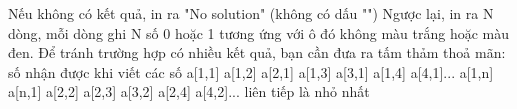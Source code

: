 Nếu không có kết quả, in ra "No solution" (không có dấu "") Ngược lại, in ra N dòng, mỗi dòng ghi N số 0 hoặc 1 tương ứng với ô đó không màu trắng hoặc màu đen. Để tránh trường hợp có nhiều kết quả, bạn cần đưa ra tấm thảm thoả mãn: số nhận được khi viết các số a[1,1] a[1,2] a[2,1] a[1,3] a[3,1] a[1,4] a[4,1]... a[1,n] a[n,1] a[2,2] a[2,3] a[3,2] a[2,4] a[4,2]... liên tiếp là nhỏ nhất